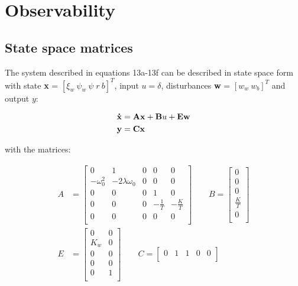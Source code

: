 \section{Observability}
\subsection{State space matrices}
The system described in equations 13a-13f \cite{assignment} can be described in state space form 
with state \textbf{x} = $[\xi_w\: \psi_w\: \psi\; r\: b]^T$, input $u = \delta$, 
disturbances \textbf{w} = $[w_w\: w_b]^T$ and output $y$:

\begin{align*}
    \bf{\dot{x}} &= \textbf{Ax} + \textbf{B}u + \textbf{Ew} \\
    \textbf{y} &= \textbf{Cx}
\end{align*}

with the matrices:

\begin{equation}
    \label{eq:State Space With Disturbances}
    \begin{aligned}
        A &= 
    	\begin{bmatrix}
        0           &      1            & 0 & 0 			 & 0 \\
        -\omega_0^2 & -2\lambda\omega_0 & 0 & 0 			 & 0 \\
        0           & 0                 & 0 & 1              & 0 \\
    	0           & 0                 & 0 & -\frac{1}{T}   & -\frac{K}{T} \\
    	0           & 0                 & 0 & 0 			 & 0 \\
      \end{bmatrix}
      \qquad
      B =
      \begin{bmatrix}
        0 \\
        0 \\
    	0 \\
        \frac{K}{T} \\
        0 \\
      \end{bmatrix}
      \\
      E &=
      \begin{bmatrix}
        0   & 0 \\
        K_w & 0 \\
    	0   & 0 \\
        0   & 0 \\
        0   & 1 \\
      \end{bmatrix}
      \qquad
      C =
      \begin{bmatrix}
        0 & 1 & 1 & 0 & 0 \\
      \end{bmatrix}
    \end{aligned}
\end{equation}

